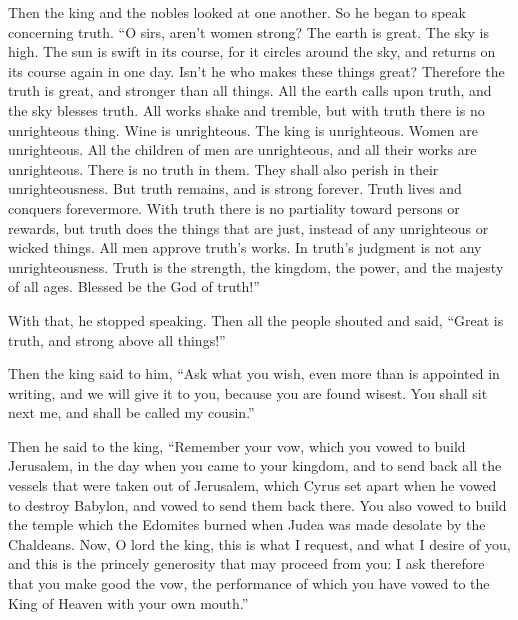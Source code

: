  Then the king and the nobles looked at one another. So he
began to speak concerning truth.  ``O sirs, aren't women
strong? The earth is great. The sky is high. The sun is swift in its
course, for it circles around the sky, and returns on its course again
in one day.  Isn't he who makes these things great?
Therefore the truth is great, and stronger than all things.
 All the earth calls upon truth, and the sky blesses truth.
All works shake and tremble, but with truth there is no unrighteous
thing.  Wine is unrighteous. The king is unrighteous. Women
are unrighteous. All the children of men are unrighteous, and all their
works are unrighteous. There is no truth in them. They shall also perish
in their unrighteousness.  But truth remains, and is strong
forever. Truth lives and conquers forevermore.  With truth
there is no partiality toward persons or rewards, but truth does the
things that are just, instead of any unrighteous or wicked things. All
men approve truth's works.  In truth's judgment is not any
unrighteousness. Truth is the strength, the kingdom, the power, and the
majesty of all ages. Blessed be the God of truth!''

 With that, he stopped speaking. Then all the people
shouted and said, ``Great is truth, and strong above all things!''

 Then the king said to him, ``Ask what you wish, even more
than is appointed in writing, and we will give it to you, because you
are found wisest. You shall sit next me, and shall be called my
cousin.''

 Then he said to the king, ``Remember your vow, which you
vowed to build Jerusalem, in the day when you came to your kingdom,
 and to send back all the vessels that were taken out of
Jerusalem, which Cyrus set apart when he vowed to destroy Babylon, and
vowed to send them back there.  You also vowed to build the
temple which the Edomites burned when Judea was made desolate by the
Chaldeans.  Now, O lord the king, this is what I request,
and what I desire of you, and this is the princely generosity that may
proceed from you: I ask therefore that you make good the vow, the
performance of which you have vowed to the King of Heaven with your own
mouth.''

